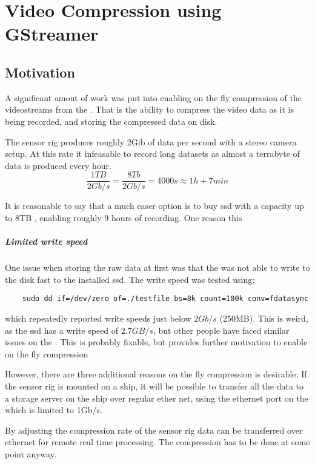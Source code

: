 \chapter{Video Compression using GStreamer}
\label{chap:gstreamer}

\section{Motivation}
A significant amout of work was put into enabling on the fly compression of the videostreams from the \sr.
That is the ability to compress the video data as it is being recorded, and storing the compressed data on disk.

The sensor rig produces roughly 2Gib of data per second with a stereo camera setup.
At this rate it infeasable to record long datasets as almost a terrabyte of data is produced every hour.
\begin{equation}
    \frac{1TB}{2Gb/s}  = \frac{8Tb}{2Gb/s}= 4000s   \approx 1h + 7min
\end{equation}

It is reasonable to say that a much easer option is to buy \gls{ssd} with a capacity up to 8TB \cite{CorsairMP600PRO}, enabling roughly 9 hours of recording.
One reason this
\cite{microntechnologyMicron2300SSD2020}


\paragraph{Limited write speed}
One issue when storing the raw data at first was that the \jx was not able to write to the disk fast to the installed \gls{ssd}.
The write speed was tested using:
\begin{verbatim}
    sudo dd if=/dev/zero of=./testfile bs=8k count=100k conv=fdatasync
\end{verbatim}
which repeatedly reported write speeds just below $2Gb/s$ (250MB).
This is weird, as the \gls{ssd} has a write speed of $2.7GB/s$, but other people have faced similar issues on the \jx \cite{microntechnologyMicron2300SSD2020} \cite{dtyuImbalancedPerformanceRead2018}.
This is probably fixable, but provides further motivation to enable on the fly compression



However, there are three additional reasons on the fly compression is desirable:
If the sensor rig is mounted on a ship, it will be possible to transfer all the data to a storage server on the ship over regular ether net, using the ethernet port on the \jx which is limited to 1Gb/s.

By adjusting the compression rate of the sensor rig data can be transferred over ethernet for remote real time processing.
The compression has to be done at some point anyway.






